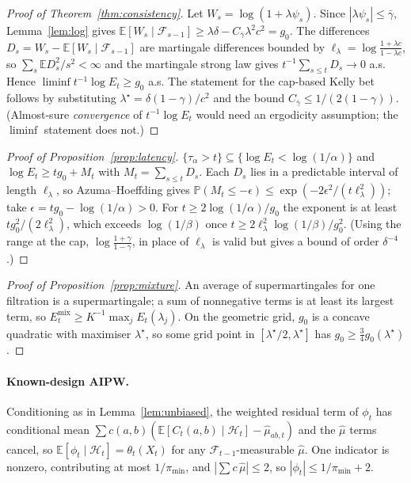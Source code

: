 \documentclass[pdflatex,sn-mathphys-ay]{sn-jnl}%
\theoremstyle{thmstyleone}%
\theoremstyle{thmstyletwo}%
\theoremstyle{thmstylethree}%
\newcommand{\E}{\mathbb{E}}
\newcommand{\Prob}{\mathbb{P}}
\newcommand{\F}{\mathcal{F}}
\begin{document}
\begin{appendices}
\begin{proof}[Proof of Theorem~\ref{thm:consistency}]
Let $W_s=\log(1+\lambda\psi_s)$. Since $|\lambda\psi_s|\le\bar\gamma$, Lemma~\ref{lem:log} gives
$\E[W_s\mid\F_{s-1}]\ge\lambda\delta-C_{\bar\gamma}\lambda^2c^2=g_0$. The differences
$D_s=W_s-\E[W_s\mid\F_{s-1}]$ are martingale differences bounded by
$\ell_\lambda=\log\frac{1+\lambda c}{1-\lambda c}$, so $\sum_s\E D_s^2/s^2<\infty$ and the martingale
strong law gives $t^{-1}\sum_{s\le t}D_s\to0$ a.s. Hence
$\liminf t^{-1}\log E_t\ge g_0$ a.s. The statement for the cap-based Kelly bet follows by
substituting $\lambda^\star=\delta(1-\gamma)/c^2$ and the bound $C_{\bar\gamma}\le1/(2(1-\gamma))$.
(Almost-sure \emph{convergence} of $t^{-1}\log E_t$ would need an ergodicity assumption; the
$\liminf$ statement does not.)
\end{proof}

\begin{proof}[Proof of Proposition~\ref{prop:latency}]
$\{\tau_\alpha>t\}\subseteq\{\log E_t<\log(1/\alpha)\}$ and $\log E_t\ge tg_0+M_t$ with
$M_t=\sum_{s\le t}D_s$. Each $D_s$ lies in a predictable interval of length $\ell_\lambda$, so
Azuma--Hoeffding \citep{azuma1967} gives $\Prob(M_t\le-\epsilon)\le\exp(-2\epsilon^2/(t\ell_\lambda^2))$;
take $\epsilon=tg_0-\log(1/\alpha)>0$. For $t\ge2\log(1/\alpha)/g_0$ the exponent is at least
$tg_0^2/(2\ell_\lambda^2)$, which exceeds $\log(1/\beta)$ once $t\ge2\ell_\lambda^2\log(1/\beta)/g_0^2$.
(Using the range at the cap, $\log\frac{1+\gamma}{1-\gamma}$, in place of $\ell_\lambda$ is valid but
gives a bound of order $\delta^{-4}$.)
\end{proof}

\begin{proof}[Proof of Proposition~\ref{prop:mixture}]
An average of supermartingales for one filtration is a supermartingale; a sum of nonnegative
terms is at least its largest term, so $E^{\mathrm{mix}}_t\ge K^{-1}\max_jE_t(\lambda_j)$. On the geometric grid,
$g_0$ is a concave quadratic with maximiser $\lambda^\star$, so some grid point in
$[\lambda^\star/2,\lambda^\star]$ has $g_0\ge\tfrac34g_0(\lambda^\star)$.
\end{proof}

\paragraph{Known-design AIPW.} Conditioning as in Lemma~\ref{lem:unbiased}, the weighted residual term
of $\phi_t$ has conditional mean $\sum c(a,b)(\E[C_t(a,b)\mid\mathcal H_t]-\hat\mu_{ab,t})$ and the
$\hat\mu$ terms cancel, so $\E[\phi_t\mid\mathcal H_t]=\theta_t(X_t)$ for any $\F_{t-1}$-measurable $\hat\mu$.
One indicator is nonzero, contributing at most $1/\pi_{\min}$, and $|\sum c\,\hat\mu|\le2$, so
$|\phi_t|\le1/\pi_{\min}+2$.


\end{appendices}
\end{document}
